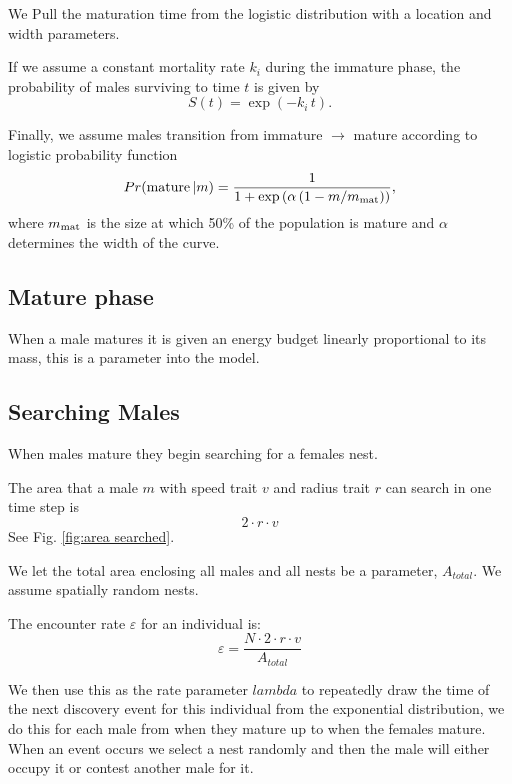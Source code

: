 \documentclass[a4paper,11pt]{article}
\begin{document}
We Pull the maturation time from the logistic distribution with a  location and width parameters.

If we assume a constant mortality rate $k_i$ during the immature phase, the probability of males surviving to time $t$ is given by
\begin{equation} \label{eq:surv_immature}
S(t) = \exp(-k_i \, t).
\end{equation}

Finally, we assume males transition from immature $\rightarrow$ mature according to logistic probability function
\begin{equation}\label{eq:allocation}
Pr({\rm mature} \, | m) = \frac1{1 + \exp\left(\alpha \left(1 - m / m_{\rm mat}\right)\right)},
\end{equation}
where $m_{\rm mat}$ is the size at which 50\% of the population is mature and $\alpha$ determines the width of the curve.

\subsection{Mature phase}
When a male matures it is given an energy budget linearly proportional to its mass, this is a parameter into the model.\\


\subsection{Searching Males}
When males mature they begin searching for a females nest.

The area that a male $m$ with speed trait $v$ and radius trait $r$ can search in one time step is
\begin{equation}
    2 \cdot r \cdot v
\end{equation}
See Fig. \ref{fig:area searched}.

We let the total area enclosing all males and all nests be a parameter, $A_{total}$. We assume spatially random nests.

The encounter rate $\varepsilon$ for an individual is:
\begin{equation} \label{eq:encounter rate}
    \varepsilon = \frac {N \cdot 2 \cdot r \cdot v} {A_{total}}
\end{equation}
\citep{Gurarie2012}

We then use this as the rate parameter $lambda$ to repeatedly draw the time of the next discovery event for this individual from the exponential distribution, we do this for each male from when they mature up to when the females mature.
When an event occurs we select a nest randomly and then the male will either occupy it or contest another male for it.
\end{document}
